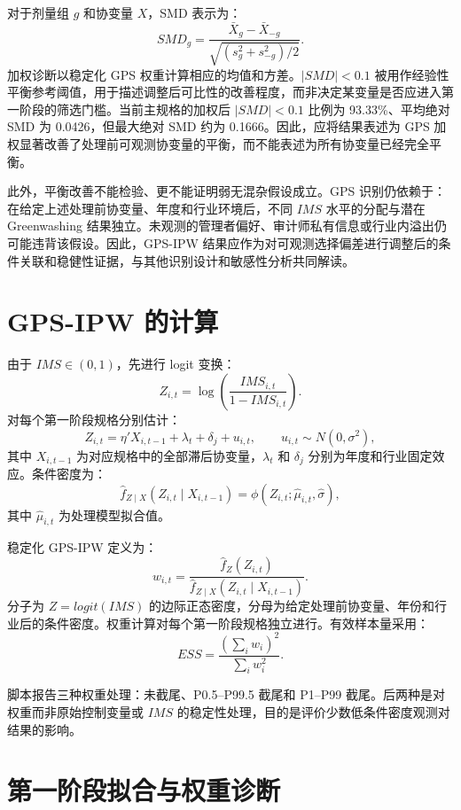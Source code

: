 \documentclass[11pt]{article}
\begin{document}
对于剂量组 $g$ 和协变量 $X$，SMD 表示为：
\[
SMD_g=\frac{\bar X_g-\bar X_{-g}}{\sqrt{(s_g^2+s_{-g}^2)/2}}.
\]
加权诊断以稳定化 GPS 权重计算相应的均值和方差。$|SMD|<0.1$ 被用作经验性平衡参考阈值，用于描述调整后可比性的改善程度，而非决定某变量是否应进入第一阶段的筛选门槛。当前主规格的加权后 $|SMD|<0.1$ 比例为 93.33\%、平均绝对 SMD 为 0.0426，但最大绝对 SMD 约为 0.1666。因此，应将结果表述为 GPS 加权显著改善了处理前可观测协变量的平衡，而不能表述为所有协变量已经完全平衡。

此外，平衡改善不能检验、更不能证明弱无混杂假设成立。GPS 识别仍依赖于：在给定上述处理前协变量、年度和行业环境后，不同 $IMS$ 水平的分配与潜在 Greenwashing 结果独立。未观测的管理者偏好、审计师私有信息或行业内溢出仍可能违背该假设。因此，GPS-IPW 结果应作为对可观测选择偏差进行调整后的条件关联和稳健性证据，与其他识别设计和敏感性分析共同解读。

\section{GPS-IPW 的计算}

由于 $IMS\in(0,1)$，先进行 logit 变换：
\[
Z_{i,t}=\log\left(\frac{IMS_{i,t}}{1-IMS_{i,t}}\right).
\]
对每个第一阶段规格分别估计：
\[
Z_{i,t}=\eta'X_{i,t-1}+\lambda_t+\delta_j+u_{i,t},
\qquad u_{i,t}\sim N(0,\sigma^2),
\]
其中 $X_{i,t-1}$ 为对应规格中的全部滞后协变量，$\lambda_t$ 和 $\delta_j$ 分别为年度和行业固定效应。条件密度为：
\[
\widehat f_{Z\mid X}(Z_{i,t}\mid X_{i,t-1})
=\phi\left(Z_{i,t};\widehat\mu_{i,t},\widehat\sigma\right),
\]
其中 $\widehat\mu_{i,t}$ 为处理模型拟合值。

稳定化 GPS-IPW 定义为：
\[
w_{i,t}=\frac{\widehat f_Z(Z_{i,t})}
{\widehat f_{Z\mid X}(Z_{i,t}\mid X_{i,t-1})}.
\]
分子为 $Z=logit(IMS)$ 的边际正态密度，分母为给定处理前协变量、年份和行业后的条件密度。权重计算对每个第一阶段规格独立进行。有效样本量采用：
\[
ESS=\frac{(\sum_iw_i)^2}{\sum_iw_i^2}.
\]

脚本报告三种权重处理：未截尾、P0.5--P99.5 截尾和 P1--P99 截尾。后两种是对权重而非原始控制变量或 $IMS$ 的稳定性处理，目的是评价少数低条件密度观测对结果的影响。

\section{第一阶段拟合与权重诊断}
\end{document}
